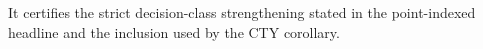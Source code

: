 It certifies the strict decision-class strengthening stated in the point-indexed headline and the inclusion used by the CTY corollary.